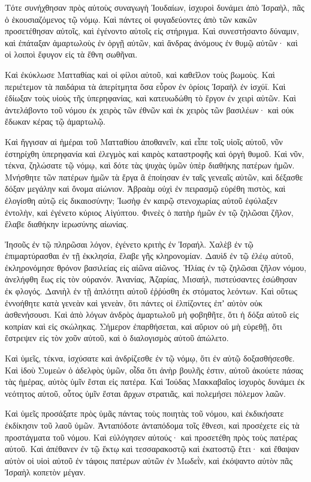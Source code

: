 {\par }{\PP {}Τότε συνήχθησαν πρὸς αὐτοὺς συναγωγὴ Ἰουδαίων, ἰσχυροὶ δυνάμει ἀπὸ Ἰσραὴλ, πᾶς ὁ ἑκουσιαζόμενος τῷ νόμῳ.
Καὶ πάντες οἱ φυγαδεύοντες ἀπὸ τῶν κακῶν προσετέθησαν αὐτοῖς, καὶ ἐγένοντο αὐτοῖς εἰς στήριγμα.
Καὶ συνεστήσαντο δύναμιν, καὶ ἐπάταξαν ἁμαρτωλοὺς ἐν ὀργῇ αὐτῶν, καὶ ἄνδρας ἀνόμους ἐν θυμῷ αὐτῶν· καὶ οἱ λοιποὶ ἔφυγον εἰς τὰ ἔθνη σωθῆναι.
\par }{\PP {}Καὶ ἐκύκλωσε Ματταθίας καὶ οἱ φίλοι αὐτοῦ, καὶ καθεῖλον τοὺς βωμοὺς.
Καὶ περιέτεμον τὰ παιδάρια τὰ ἀπερίτμητα ὅσα εὗρον ἐν ὁρίοις Ἰσραὴλ ἐν ἰσχύϊ.
Καὶ ἐδίωξαν τοὺς υἱοὺς τῆς ὑπερηφανίας, καὶ κατευωδώθη τὸ ἔργον ἐν χειρὶ αὐτῶν.
Καὶ ἀντελάβοντο τοῦ νόμου ἐκ χειρὸς τῶν ἐθνῶν καὶ ἐκ χειρὸς τῶν βασιλέων· καὶ οὐκ ἔδωκαν κέρας τῷ ἁμαρτωλῷ.
\par }{\PP {}Καὶ ἤγγισαν αἱ ἡμέραι τοῦ Ματταθίου ἀποθανεῖν, καὶ εἶπε τοῖς υἱοῖς αὐτοῦ, νῦν ἐστηρίχθη ὑπερηφανία καὶ ἐλεγμὸς καὶ καιρὸς καταστροφῆς καὶ ὀργὴ θυμοῦ.
Καὶ νῦν, τέκνα, ζηλώσατε τῷ νόμῳ, καὶ δότε τὰς ψυχὰς ὑμῶν ὑπὲρ διαθήκης πατέρων ἡμῶν.
Μνήσθητε τῶν πατέρων ἡμῶν τὰ ἔργα ἃ ἐποίησαν ἐν ταῖς γενεαῖς αὐτῶν, καὶ δέξασθε δόξαν μεγάλην καὶ ὄνομα αἰώνιον.
Ἁβραὰμ οὐχὶ ἐν πειρασμῷ εὑρέθη πιστὸς, καὶ ἐλογίσθη αὐτῷ εἰς δικαιοσύνην;
Ἰωσὴφ ἐν καιρῷ στενοχωρίας αὐτοῦ ἐφύλαξεν ἐντολὴν, καὶ ἐγένετο κύριος Αἰγύπτου.
Φινεὲς ὁ πατὴρ ἡμῶν ἐν τῷ ζηλῶσαι ζῆλον, ἔλαβε διαθήκην ἱερωσύνης αἰωνίας.
\par }{\PP {}Ἰησοῦς ἐν τῷ πληρῶσαι λόγον, ἐγένετο κριτὴς ἐν Ἰσραήλ.
Χαλὲβ ἐν τῷ ἐπιμαρτύρασθαι ἐν τῇ ἐκκλησία, ἔλαβε γῆς κληρονομίαν.
Δαυὶδ ἐν τῷ ἐλέῳ αὐτοῦ, ἐκληρονόμησε θρόνον βασιλείας εἰς αἰῶνα αἰῶνος.
Ἡλίας ἐν τῷ ζηλῶσαι ζῆλον νόμου, ἀνελήφθη ἕως εἰς τὸν οὐρανόν.
Ἀνανίας, Ἀζαρίας, Μισαήλ, πιστεύσαντες ἐσώθησαν ἐκ φλογός.
Δανιὴλ ἐν τῇ ἁπλότητι αὐτοῦ ἐῤῥύσθη ἐκ στόματος λεόντων.
Καὶ οὕτως ἐννοήθητε κατὰ γενεὰν καὶ γενεὰν, ὅτι πάντες οἱ ἐλπίζοντες ἐπʼ αὐτὸν οὐκ ἀσθενήσουσι.
Καὶ ἀπὸ λόγων ἀνδρὸς ἁμαρτωλοῦ μὴ φοβηθῆτε, ὅτι ἡ δόξα αὐτοῦ εἰς κοπρίαν καὶ εἰς σκώληκας.
Σήμερον ἐπαρθήσεται, καὶ αὔριον οὐ μὴ εὑρεθῇ, ὅτι ἔστρεψεν εἰς τὸν χοῦν αὐτοῦ, καὶ ὁ διαλογισμὸς αὐτοῦ ἀπώλετο.
\par }{\PP {}Καὶ ὑμεῖς, τέκνα, ἰσχύσατε καὶ ἀνδρίζεσθε ἐν τῷ νόμῳ, ὅτι ἐν αὐτῷ δοξασθήσεσθε.
Καὶ ἰδοὺ Συμεὼν ὁ ἀδελφὸς ὑμῶν, οἶδα ὅτι ἀνὴρ βουλῆς ἐστιν, αὐτοῦ ἀκούετε πάσας τὰς ἡμέρας, αὐτὸς ὑμῖν ἔσται εἰς πατέρα.
Καὶ Ἰούδας Μακκαβαῖος ἰσχυρὸς δυνάμει ἐκ νεότητος αὐτοῦ, οὗτος ὑμῖν ἔσται ἄρχων στρατιᾶς, καὶ πολεμήσει πόλεμον λαῶν.
\par }{\PP {}Καὶ ὑμεῖς προσάξατε πρὸς ὑμᾶς πάντας τοὺς ποιητὰς τοῦ νόμου, καὶ ἐκδικήσατε ἐκδίκησιν τοῦ λαοῦ ὑμῶν.
Ἀνταπόδοτε ἀνταπόδομα τοῖς ἔθνεσι, καὶ προσέχετε εἰς τὰ προστάγματα τοῦ νόμου.
Καὶ εὐλόγησεν αὐτούς· καὶ προσετέθη πρὸς τοὺς πατέρας αὐτοῦ.
Καὶ ἀπέθανεν ἐν τῷ ἕκτῳ καὶ τεσσαρακοστῷ καὶ ἑκατοστῷ ἔτει· καὶ ἔθαψαν αὐτὸν οἱ υἱοὶ αὐτοῦ ἐν τάφοις πατέρων αὐτῶν ἐν Μωδεῒν, καὶ ἐκόψαντο αὐτὸν πᾶς Ἰσραὴλ κοπετὸν μέγαν.

}
